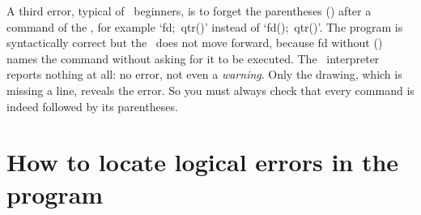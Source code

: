 A third error, typical of \python\ beginners, is to forget the parentheses
{\idt ()} after a command of the \robot, for example `{\idt fd;\ qtr()}' instead of
`{\idt fd();\ qtr()}'. The program is syntactically correct but the \robot\ does not move forward,
because {\idt fd} without {\idt ()} names the command without asking for it to be executed.
The \python\ interpreter reports nothing at all: no error, not even
a {\em warning}.
Only the drawing, which is missing a line, reveals the error. So you must always
check that every command is indeed followed by its parentheses.

\section{How to locate logical errors in the program}

